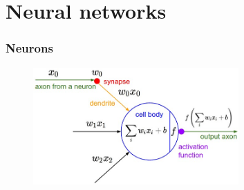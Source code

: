 
\section{Neural networks}

\begin{frame}
	\frametitle{Neurons}

	\centering
        \begin{figure}
                \includegraphics[width=0.7\textwidth]{Pics/neuron_model}
        \end{figure}

\end{frame}


